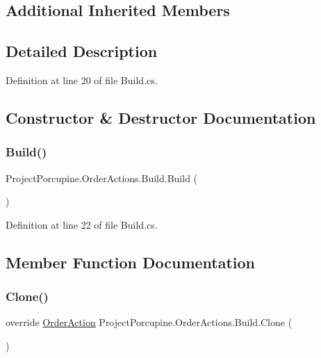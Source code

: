 \subsection*{Additional Inherited Members}


\subsection{Detailed Description}


Definition at line 20 of file Build.\+cs.



\subsection{Constructor \& Destructor Documentation}
\mbox{\label{class_project_porcupine_1_1_order_actions_1_1_build_abd9690fe03fc7e392e2b9190f3d8a46c}} 
\subsubsection{\texorpdfstring{Build()}{Build()}}
{\footnotesize\ttfamily Project\+Porcupine.\+Order\+Actions.\+Build.\+Build (\begin{DoxyParamCaption}{ }\end{DoxyParamCaption})}



Definition at line 22 of file Build.\+cs.



\subsection{Member Function Documentation}
\mbox{\label{class_project_porcupine_1_1_order_actions_1_1_build_af00322a255be2f3913556c114bead18e}} 
\subsubsection{\texorpdfstring{Clone()}{Clone()}}
{\footnotesize\ttfamily override \hyperlink{class_project_porcupine_1_1_order_actions_1_1_order_action}{Order\+Action} Project\+Porcupine.\+Order\+Actions.\+Build.\+Clone (\begin{DoxyParamCaption}{ }\end{DoxyParamCaption})\hspace{0.3cm}{\ttfamily [virtual]}}



